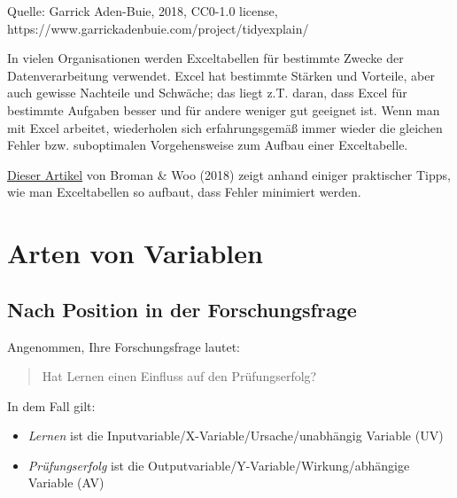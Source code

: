 \documentclass[
  a4paper,
  DIV=11]{scrreprt}
\providecommand{\tightlist}{%
  \setlength{\itemsep}{0pt}\setlength{\parskip}{0pt}}\usepackage{longtable,booktabs,array}
\theoremstyle{definition}
\theoremstyle{definition}
\theoremstyle{definition}
\theoremstyle{remark}
\begin{document}
{Quelle: Garrick Aden-Buie, 2018, CC0-1.0 license,
https://www.garrickadenbuie.com/project/tidyexplain/}

\begin{tcolorbox}[enhanced jigsaw, toptitle=1mm, rightrule=.15mm, colbacktitle=quarto-callout-tip-color!10!white, breakable, title=\textcolor{quarto-callout-tip-color}{\faLightbulb}\hspace{0.5em}{Tipp}, bottomrule=.15mm, colback=white, opacitybacktitle=0.6, left=2mm, titlerule=0mm, toprule=.15mm, coltitle=black, opacityback=0, bottomtitle=1mm, arc=.35mm, leftrule=.75mm, colframe=quarto-callout-tip-color-frame]

In vielen Organisationen werden Exceltabellen für bestimmte Zwecke der
Datenverarbeitung verwendet. Excel\footnotemark{} hat bestimmte Stärken
und Vorteile, aber auch gewisse Nachteile und Schwäche; das liegt z.T.
daran, dass Excel für bestimmte Aufgaben besser und für andere weniger
gut geeignet ist. Wenn man mit Excel arbeitet, wiederholen sich
erfahrungsgemäß immer wieder die gleichen Fehler bzw. suboptimalen
Vorgehensweise zum Aufbau einer Exceltabelle.

\href{https://www.tandfonline.com/doi/full/10.1080/00031305.2017.1375989}{Dieser
Artikel} von Broman \& Woo (2018) zeigt anhand einiger praktischer
Tipps, wie man Exceltabellen so aufbaut, dass Fehler minimiert werden.

\end{tcolorbox}


\section{Arten von Variablen}\label{sec-arten-variablen}

\subsection{Nach Position in der
Forschungsfrage}\label{nach-position-in-der-forschungsfrage}

Angenommen, Ihre Forschungsfrage lautet:

\begin{quote}
Hat Lernen einen Einfluss auf den Prüfungserfolg?
\end{quote}

In dem Fall gilt:

\begin{itemize}
\tightlist
\item
  \emph{Lernen} ist die Inputvariable/X-Variable/Ursache/unabhängig
  Variable (UV)
\item
  \emph{Prüfungserfolg} ist die
  Outputvariable/Y-Variable/Wirkung/abhängige Variable (AV)
\end{itemize}
\end{document}
